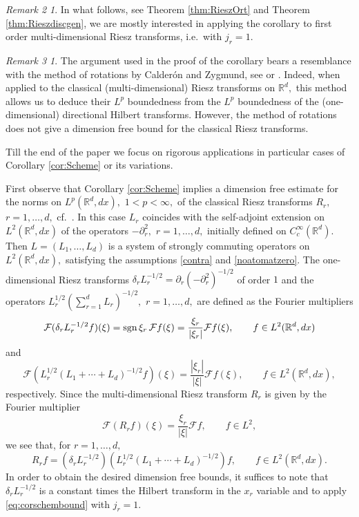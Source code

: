 \documentclass[leqno,12pt]{amsart}
\theoremstyle{definition}
\theoremstyle{remark}
\newtheorem*{remark2}{Remark 2}
\newtheorem*{remark3}{Remark 3}
\begin{document}
\begin{remark2}
In what follows, see Theorem \ref{thm:RieszOrt} and Theorem \ref{thm:Rieszdiscgen}, we are mostly interested in applying the corollary to first order multi-dimensional Riesz transforms, i.e.\ with $j_r=1.$
\end{remark2}
\begin{remark3}
The argument used in the proof of the corollary bears a resemblance with the method of rotations by Calder\'on and Zygmund, see \cite{Cal-Zyg1} or \cite[Corollary 4.8]{Duo}. Indeed, when applied to the classical (multi-dimensional) Riesz transforms on $\mathbb{R}^d,$ this method allows us to deduce their $L^p$ boundedness from the $L^p$ boundedness of the (one-dimensional) directional Hilbert transforms. However, the method of rotations does not give a dimension free bound for the classical Riesz transforms.
\end{remark3}

Till the end of the paper we focus on rigorous applications in particular cases of Corollary \ref{cor:Scheme} or its variations.

First observe that Corollary \ref{cor:Scheme} implies a dimension free estimate for the norms on $L^p(\mathbb{R}^d,dx),$ $1<p<\infty,$ of the classical Riesz transforms $R_r,$ $r=1,\ldots,d,$ cf.\ \cite{SteinRiesz}. In this case $L_r$ coincides with the self-adjoint extension on $L^2(\mathbb{R}^d,dx)$ of the operators $-\partial_r^2,$ $r=1,\ldots,d,$ initially defined on $C_c^{\infty}(\mathbb{R}^d).$ Then $L=(L_1,\ldots,L_d)$ is a system of strongly commuting operators on $L^2(\mathbb{R}^d,dx),$ satisfying the assumptions \eqref{contra} and \eqref{noatomatzero}. The one-dimensional Riesz transforms $\delta_r L_r^{-1/2}=\partial_r(-\partial_r^2)^{-1/2}$ of order $1$ and the operators $L_r^{1/2}(\sum_{r=1}^d L_r)^{-1/2},$ $r=1,\ldots,d,$  are defined as the Fourier multipliers $${\mathcal{F}}(\delta_r L_r^{-1/2} f)(\xi)={\rm sgn}\, \xi_r\,{\mathcal{F}} f(\xi)=\frac{\xi_r}{|\xi_r|}{\mathcal{F}} f(\xi),\qquad f\in L^2(\mathbb{R}^d,dx)$$ and $${\mathcal{F}}(L_r^{1/2}(L_1+\cdots+ L_d)^{-1/2}f)(\xi)=\frac{|\xi_r|}{|\xi|}{\mathcal{F}} f(\xi),\qquad f\in L^2(\mathbb{R}^d,dx),$$ respectively. Since the multi-dimensional Riesz transform $R_r$ is given by the Fourier multiplier $${\mathcal{F}}(R_r f)(\xi)=\frac{\xi_r}{|\xi|}{\mathcal{F}} f,\qquad f\in L^2,$$
we see that, for $r=1,\ldots,d,$
$$R_r f=(\delta_r L_r^{-1/2}) (L_r^{1/2}(L_1+\cdots+ L_d)^{-1/2})f,\qquad f\in L^2(\mathbb{R}^d,dx). $$
In order to obtain the desired dimension free bounds, it suffices to note that $\delta_r L_r^{-1/2}$ is a constant times the Hilbert transform in the $x_r$ variable and to apply \eqref{eq:corschembound} with $j_r=1$.
\end{document}
